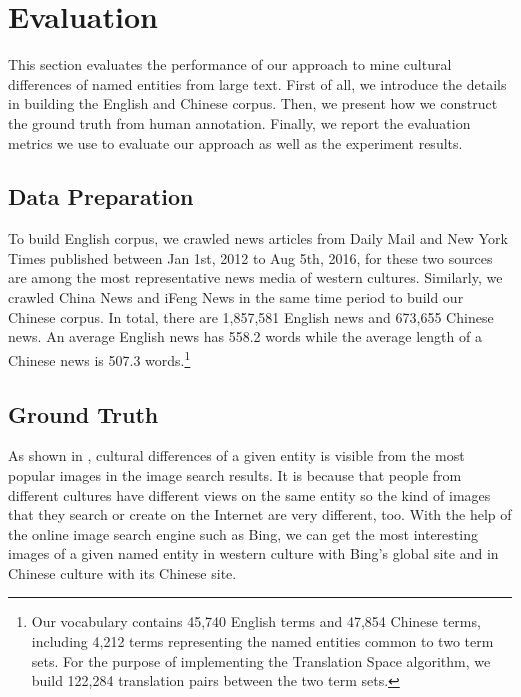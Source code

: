 \section{Evaluation}

This section evaluates the performance of our approach to mine cultural differences of named entities from large text.
First of all, we introduce the details in building the English and
Chinese corpus.
Then, we present how we construct the ground truth from human annotation.
Finally, we report the evaluation metrics we use to evaluate our approach
as well as the experiment results.

\subsection{Data Preparation}
\label{sec:dataeval}
To build English corpus, we  crawled news articles from Daily Mail and New York Times
published between Jan 1st, 2012 to Aug 5th, 2016, for these two sources
are among the most representative news media of western cultures.
Similarly, we crawled China News
and iFeng News in the same time period to build our Chinese corpus.
In total, there are 1,857,581 English news and 673,655 Chinese news.
An average English news has 558.2 words while the average length of a
Chinese news is 507.3 words.\footnote{Our vocabulary contains 45,740 English terms and
	47,854 Chinese terms,  including 4,212 terms representing the
	named entities common to two term sets.
	For the purpose of implementing the Translation Space algorithm,
	we build 122,284 translation pairs between the two term sets.}

\subsection{Ground Truth}

As shown in , cultural differences of a given entity
is visible from the most popular images in the image search results.
It is because that people from different cultures have different views
on the same entity so the kind of images that they search or create
on the Internet are very different, too.
With the help of the online image search engine such as Bing,
we can get the most interesting images of a given named entity
in western culture with Bing's global
site and in Chinese culture
with its Chinese site.



